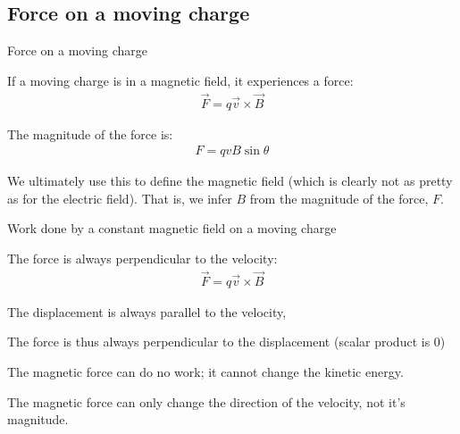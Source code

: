 \documentclass[aspectratio=169,
hyperref={colorlinks,urlcolor=blue}
]{beamer}
\begin{document}
\subsection{Force on a moving charge}
\label{subsec:forceonamovingcharge}
\begin{bulletframe}{Force on a moving charge}
\item If a moving charge is in a magnetic field, it experiences a force:
\begin{align*}
\vec F = q \vec v \times \vec B
\end{align*}
\item The magnitude of the force is:
\begin{align*}
F=qvB\sin\theta
\end{align*}
\item[$\rightarrow$] We ultimately use this to define the magnetic field (which is clearly not as pretty as for the electric field). That is, we infer $B$ from the magnitude of the force, $F$.
\end{bulletframe}







\begin{bulletframe}{Work done by a constant magnetic field on a moving charge}
\item The force is always perpendicular to the velocity:
\begin{align*}
\vec F = q \vec v \times \vec B
\end{align*}
\item The displacement is always parallel to the velocity, 
\item The force is thus always perpendicular to the displacement (scalar product is 0)
\item[$\rightarrow$] The magnetic force can do no work; it cannot change the kinetic energy. 
\item[$\rightarrow$] The magnetic force can only change the direction of the velocity, not it’s magnitude.
\end{bulletframe}







\end{document}
